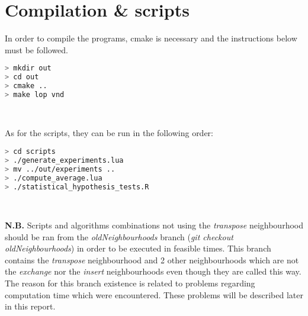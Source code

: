 \section{Compilation \& scripts}

\noindent In order to compile the programs, cmake is necessary and the instructions below
must be followed.

\begin{lstlisting}[language=bash]
> mkdir out
> cd out
> cmake ..
> make lop vnd
\end{lstlisting}
\

\noindent As for the scripts, they can be run in the following order:
\begin{lstlisting}[language=bash]
> cd scripts
> ./generate_experiments.lua
> mv ../out/experiments ..
> ./compute_average.lua
> ./statistical_hypothesis_tests.R
\end{lstlisting}
\

\begin{framehint}
    \textbf{N.B.} Scripts and algorithms combinations not using the \emph{transpose}
    neighbourhood should be ran from the \emph{oldNeighbourhoods} branch
    (\emph{git checkout oldNeighbourhoods}) in order to be executed in feasible
    times. This branch contains the \emph{transpose} neighbourhood and 2 other
    neighbourhoods which are not the \emph{exchange} nor the \emph{insert}
    neighbourhoods even though they are called this way.
    The reason for this branch existence is related to problems regarding
    computation time which were encountered. These problems will be described
    later in this report.
\end{framehint}

\newpage
